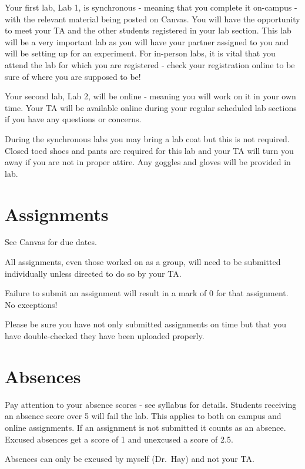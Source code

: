 \documentclass[
]{book}
\begin{document}
Your first lab, Lab 1, is synchronous - meaning that you complete it on-campus - with the relevant material being posted on Canvas. You will have the opportunity to meet your TA and the other students registered in your lab section. This lab will be a very important lab as you will have your partner assigned to you and will be setting up for an experiment. For in-person labs, it is vital that you attend the lab for which you are registered - check your registration online to be sure of where you are supposed to be!

Your second lab, Lab 2, will be online - meaning you will work on it in your own time. Your TA will be available online during your regular scheduled lab sections if you have any questions or concerns.

During the synchronous labs you may bring a lab coat but this is not required. Closed toed shoes and pants are required for this lab and your TA will turn you away if you are not in proper attire. Any goggles and gloves will be provided in lab.

\hypertarget{assignments}{%
\section*{Assignments}\label{assignments}}

See Canvas for due dates.

All assignments, even those worked on as a group, will need to be submitted individually unless directed to do so by your TA.

Failure to submit an assignment will result in a mark of 0 for that assignment. No exceptions!

Please be sure you have not only submitted assignments on time but that you have double-checked they have been uploaded properly.

\hypertarget{absences}{%
\section*{Absences}\label{absences}}

Pay attention to your absence scores - see syllabus for details. Students receiving an absence score over 5 will fail the lab. This applies to both on campus and online assignments. If an assignment is not submitted it counts as an absence. Excused absences get a score of 1 and unexcused a score of 2.5.

Absences can only be excused by myself (Dr.~Hay) and not your TA.
\end{document}
